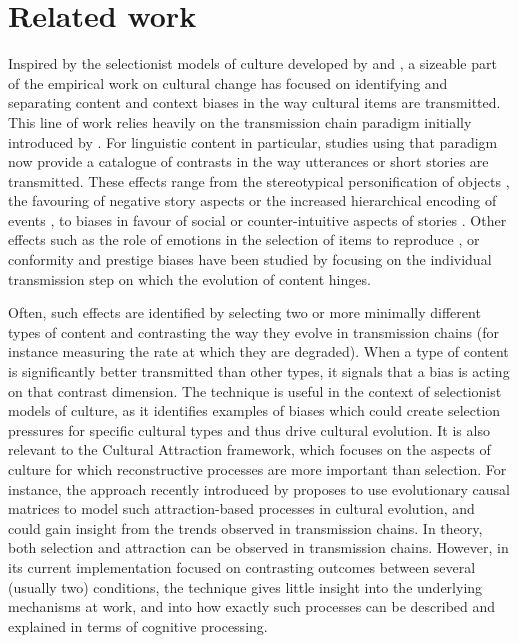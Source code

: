 \documentclass[a4paper,fleqn]{cas-dc}
\begin{document}
\section{Related work}\label{sec:gistr-related}

Inspired by the selectionist models of culture developed by
\citet{boyd_culture_1985} and
\citet{cavalli-sforza_cultural_1981}, a sizeable part of the
empirical work on cultural change has focused on identifying and separating content and
context biases in the way cultural items are transmitted. This line of
work relies heavily on the transmission chain paradigm initially
introduced by \citet{bartlett_remembering:_1995}. For linguistic
content in particular, studies using that paradigm now provide a
catalogue of contrasts in the way utterances or short stories are
transmitted. These effects range from the stereotypical personification
of objects \citep{bangerter_transformation_2000}, the favouring of
negative story aspects \citep{bebbington_sky_2017} or the increased
hierarchical encoding of events \citep{mesoudi_hierarchical_2004}, to
biases in favour of social \citep{mesoudi_bias_2006} or
counter-intuitive aspects of stories
\citep{norenzayan_memory_2006,barrett_spreading_2001}. Other
effects such as the role of emotions in the selection of items to
reproduce \citep{heath_emotional_2001,eriksson_corpses_2014}, or
conformity and prestige biases \citep{acerbi_did_2017} have been
studied by focusing on the individual transmission step on which the
evolution of content hinges.

Often, such effects are identified by selecting two or more minimally
different types of content and contrasting the way they evolve in
transmission chains (for instance measuring the rate at which they are
degraded). When a type of content is significantly better transmitted
than other types, it signals that a bias is acting on that contrast
dimension. The technique is useful in the context of selectionist models
of culture, as it identifies examples of biases which could create
selection pressures for specific cultural types and thus drive cultural
evolution. It is also relevant to the Cultural Attraction framework,
which focuses on the aspects of culture for which reconstructive
processes are more important than selection. For instance, the approach
recently introduced by \citet{claidiere_how_2014} proposes to
use evolutionary causal matrices to model such attraction-based
processes in cultural evolution, and could gain insight from the trends
observed in transmission chains.
In theory,
both selection and attraction can be observed in transmission chains. However, in
its current implementation focused on contrasting outcomes between
several (usually two) conditions, the technique gives little insight
into the underlying mechanisms at work, and into how exactly such processes
can be described and explained in terms of cognitive %
processing.
\end{document}
